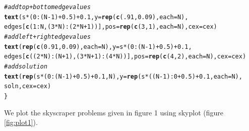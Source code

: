 \documentclass[12pt]{article}\usepackage[]{graphicx}\usepackage[]{color}
\makeatletter
\newcommand{\hlnum}[1]{\textcolor[rgb]{0.686,0.059,0.569}{#1}}%
\newcommand{\hlcom}[1]{\textcolor[rgb]{0.678,0.584,0.686}{\textit{#1}}}%
\newcommand{\hlopt}[1]{\textcolor[rgb]{0,0,0}{#1}}%
\newcommand{\hlstd}[1]{\textcolor[rgb]{0.345,0.345,0.345}{#1}}%
\newcommand{\hlkwc}[1]{\textcolor[rgb]{0.333,0.667,0.333}{#1}}%
\newcommand{\hlkwd}[1]{\textcolor[rgb]{0.737,0.353,0.396}{\textbf{#1}}}%
\newenvironment{kframe}{%
 \def\at@end@of@kframe{}%
 \ifinner\ifhmode%
  \def\at@end@of@kframe{\end{minipage}}%
  \begin{minipage}{\columnwidth}%
 \fi\fi%
 \def\FrameCommand##1{\hskip\@totalleftmargin \hskip-\fboxsep
 \colorbox{shadecolor}{##1}\hskip-\fboxsep
     \hskip-\linewidth \hskip-\@totalleftmargin \hskip\columnwidth}%
 \MakeFramed {\advance\hsize-\width
   \@totalleftmargin\z@ \linewidth\hsize
   \@setminipage}}%
 {\par\unskip\endMakeFramed%
 \at@end@of@kframe}
\newenvironment{knitrout}{}{} %
\makeatother
\begin{document}
\begin{knitrout}
\begin{kframe}
\begin{alltt}
  \hlcom{#add top + bottom edge values}
  \hlkwd{text}\hlstd{( s}\hlopt{*}\hlstd{(}\hlnum{0}\hlopt{:}\hlstd{(N}\hlopt{-}\hlnum{1}\hlstd{)}\hlopt{+}\hlnum{0.5}\hlstd{)}\hlopt{+}\hlnum{0.1}\hlstd{,} \hlkwc{y}\hlstd{=}\hlkwd{rep}\hlstd{(}\hlkwd{c}\hlstd{(}\hlnum{.91}\hlstd{,} \hlnum{0.09}\hlstd{),}\hlkwc{each}\hlstd{=N),}
        \hlstd{edges[}\hlkwd{c}\hlstd{(}\hlnum{1}\hlopt{:}\hlstd{N,(}\hlnum{3}\hlopt{*}\hlstd{N)}\hlopt{:}\hlstd{(}\hlnum{2}\hlopt{*}\hlstd{N}\hlopt{+}\hlnum{1}\hlstd{))],} \hlkwc{pos} \hlstd{=} \hlkwd{rep}\hlstd{(}\hlkwd{c}\hlstd{(}\hlnum{3}\hlstd{,}\hlnum{1}\hlstd{),}\hlkwc{each}\hlstd{=N),} \hlkwc{cex} \hlstd{= cex )}
  \hlcom{#add left+right edge values}
  \hlkwd{text}\hlstd{(} \hlkwd{rep}\hlstd{(}\hlkwd{c}\hlstd{(}\hlnum{0.91}\hlstd{,}\hlnum{0.09}\hlstd{),}\hlkwc{each}\hlstd{=N),} \hlkwc{y}\hlstd{=s}\hlopt{*}\hlstd{(}\hlnum{0}\hlopt{:}\hlstd{(N}\hlopt{-}\hlnum{1}\hlstd{)}\hlopt{+}\hlnum{0.5}\hlstd{)}\hlopt{+}\hlnum{0.1}\hlstd{,}
        \hlstd{edges[}\hlkwd{c}\hlstd{((}\hlnum{2}\hlopt{*}\hlstd{N)}\hlopt{:}\hlstd{(N}\hlopt{+}\hlnum{1}\hlstd{),(}\hlnum{3}\hlopt{*}\hlstd{N}\hlopt{+}\hlnum{1}\hlstd{)}\hlopt{:}\hlstd{(}\hlnum{4}\hlopt{*}\hlstd{N))],} \hlkwc{pos} \hlstd{=} \hlkwd{rep}\hlstd{(}\hlkwd{c}\hlstd{(}\hlnum{4}\hlstd{,}\hlnum{2}\hlstd{),}\hlkwc{each}\hlstd{=N),} \hlkwc{cex} \hlstd{= cex )}
  \hlcom{#add solution}
  \hlkwd{text}\hlstd{(} \hlkwd{rep}\hlstd{(s}\hlopt{*}\hlstd{(}\hlnum{0}\hlopt{:}\hlstd{(N}\hlopt{-}\hlnum{1}\hlstd{)}\hlopt{+}\hlnum{0.5}\hlstd{)}\hlopt{+}\hlnum{0.1}\hlstd{, N),} \hlkwc{y}\hlstd{=}\hlkwd{rep}\hlstd{(s}\hlopt{*}\hlstd{((N}\hlopt{-}\hlnum{1}\hlstd{)}\hlopt{:}\hlnum{0}\hlopt{+}\hlnum{0.5}\hlstd{)}\hlopt{+}\hlnum{0.1}\hlstd{,} \hlkwc{each}\hlstd{=N),}
        \hlstd{soln,} \hlkwc{cex} \hlstd{= cex)}
\hlstd{\}}
\end{alltt}
\end{kframe}
\end{knitrout}
We plot the skyscraper problems given in figure 1 using skyplot (figure \ref{fig:plot1}).\\
\end{document}
